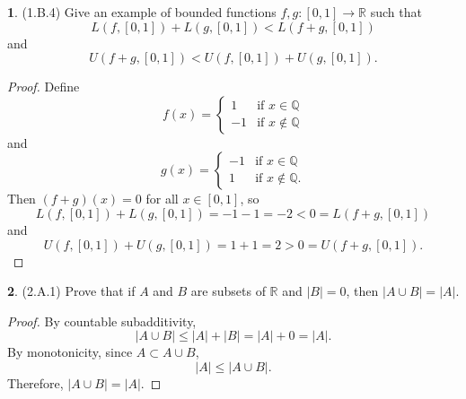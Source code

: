 \documentclass[12pt]{article}
\theoremstyle{definition}
\newtheorem{ex}{}
\begin{document}
\begin{ex}
	(1.B.4)
	Give an example of bounded functions $f, g: [0, 1] \to \mathbb{R}$ such that \begin{equation*}
		L(f, [0, 1]) + L(g, [0, 1]) < L(f + g, [0, 1])
	\end{equation*}
	and \begin{equation*}
		U(f + g, [0, 1]) < U(f, [0, 1]) + U(g, [0, 1]).
	\end{equation*}
\end{ex}
\begin{proof}
	Define \begin{equation*}
		f(x) = \begin{cases}
			1  & \text{if $x \in \mathbb{Q}$}    \\
			-1 & \text{if $x \notin \mathbb{Q}$}
		\end{cases}
	\end{equation*}
	and \begin{equation*}
		g(x) = \begin{cases}
			-1 & \text{if $x \in \mathbb{Q}$}     \\
			1  & \text{if $x \notin \mathbb{Q}$}.
		\end{cases}
	\end{equation*}
	Then $(f + g)(x) = 0$ for all $x \in [0, 1]$, so \begin{equation*}
		L(f, [0, 1]) + L(g, [0, 1]) = -1 - 1 = -2 < 0 = L(f + g, [0, 1])
	\end{equation*}  and \begin{equation*}
		U(f, [0, 1]) + U(g, [0, 1]) = 1 + 1 = 2 > 0 = U(f + g, [0, 1]).
	\end{equation*}
\end{proof}

\begin{ex}
	(2.A.1)
	Prove that if $A$ and $B$ are subsets of $\mathbb{R}$ and $|B| = 0$, then $|A \cup B| = |A|$.
\end{ex}
\begin{proof}
	By countable subadditivity, \begin{equation*}
		|A \cup B| \leq |A| + |B| = |A| + 0 = |A|.
	\end{equation*}
	By monotonicity, since $A \subset A \cup B$, \begin{equation*}
		|A| \leq |A \cup B|.
	\end{equation*}
	Therefore, $|A \cup B| = |A|$.
\end{proof}
\end{document}
